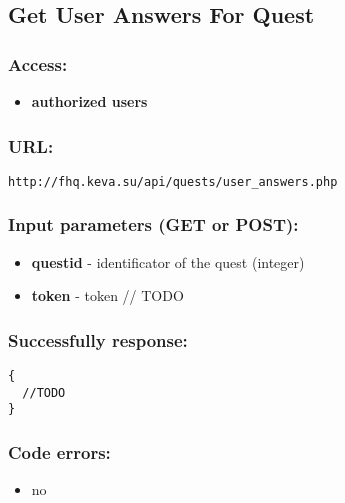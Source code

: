 \subsection{Get User Answers For Quest}
\par

\subsubsection{Access:}
\begin{itemize}
  \item \textbf{authorized users}
\end{itemize}

\subsubsection{URL:}
\begin{Verbatim}[frame=single]
http://fhq.keva.su/api/quests/user_answers.php
\end{Verbatim}

\subsubsection{Input parameters (GET or POST):}
\begin{itemize}
  \item \textbf{questid} - identificator of the quest (integer)
  \item \textbf{token} - token // TODO
\end{itemize}

\subsubsection{Successfully response:}
\begin{Verbatim}[frame=single]
{
  //TODO
}
\end{Verbatim}

\subsubsection{Code errors:}
\begin{itemize}
	\item no
\end{itemize}

